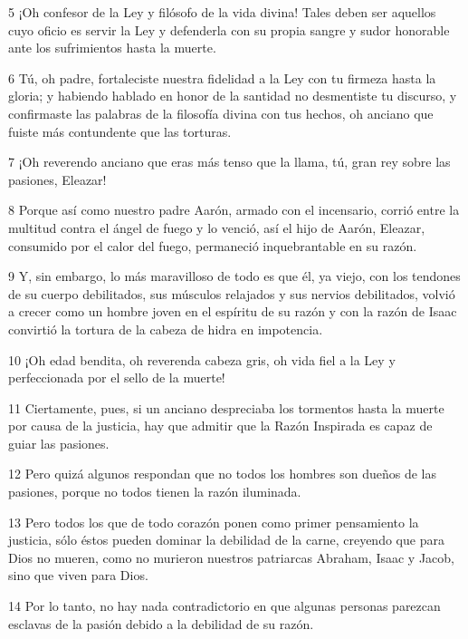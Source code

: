 \par 5 ¡Oh confesor de la Ley y filósofo de la vida divina! Tales deben ser aquellos cuyo oficio es servir la Ley y defenderla con su propia sangre y sudor honorable ante los sufrimientos hasta la muerte.

\par 6 Tú, oh padre, fortaleciste nuestra fidelidad a la Ley con tu firmeza hasta la gloria; y habiendo hablado en honor de la santidad no desmentiste tu discurso, y confirmaste las palabras de la filosofía divina con tus hechos, oh anciano que fuiste más contundente que las torturas.

\par 7 ¡Oh reverendo anciano que eras más tenso que la llama, tú, gran rey sobre las pasiones, Eleazar!

\par 8 Porque así como nuestro padre Aarón, armado con el incensario, corrió entre la multitud contra el ángel de fuego y lo venció, así el hijo de Aarón, Eleazar, consumido por el calor del fuego, permaneció inquebrantable en su razón.

\par 9 Y, sin embargo, lo más maravilloso de todo es que él, ya viejo, con los tendones de su cuerpo debilitados, sus músculos relajados y sus nervios debilitados, volvió a crecer como un hombre joven en el espíritu de su razón y con la razón de Isaac convirtió la tortura de la cabeza de hidra en impotencia.

\par 10 ¡Oh edad bendita, oh reverenda cabeza gris, oh vida fiel a la Ley y perfeccionada por el sello de la muerte!

\par 11 Ciertamente, pues, si un anciano despreciaba los tormentos hasta la muerte por causa de la justicia, hay que admitir que la Razón Inspirada es capaz de guiar las pasiones.

\par 12 Pero quizá algunos respondan que no todos los hombres son dueños de las pasiones, porque no todos tienen la razón iluminada.

\par 13 Pero todos los que de todo corazón ponen como primer pensamiento la justicia, sólo éstos pueden dominar la debilidad de la carne, creyendo que para Dios no mueren, como no murieron nuestros patriarcas Abraham, Isaac y Jacob, sino que viven para Dios.

\par 14 Por lo tanto, no hay nada contradictorio en que algunas personas parezcan esclavas de la pasión debido a la debilidad de su razón.

